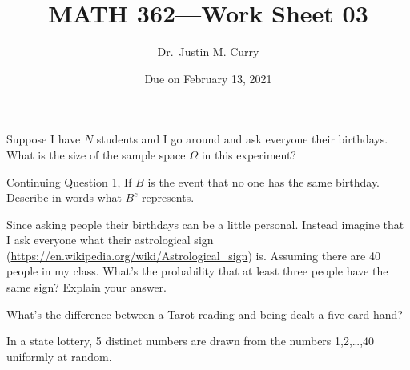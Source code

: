 \documentclass[addpoints,12pt]{exam}
\title{\vspace{-1in} MATH 362---Work Sheet 03}
\date{Due on February 13, 2021}
\author{Dr.~Justin M. Curry}
\begin{document}
\maketitle


\begin{questions}

\question[1] Suppose I have $N$ students and I go around and ask everyone their birthdays. What is the size of the sample space $\Omega$ in this experiment? 
\vspace{1in}

\question[1] Continuing Question 1, If $B$ is the event that no one has the same birthday. Describe in words what $B^c$ represents.
\vspace{1in}

\question[2] Since asking people their birthdays can be a little personal. Instead imagine that I ask everyone what their astrological sign (\url{https://en.wikipedia.org/wiki/Astrological_sign}) is. Assuming there are 40 people in my class. What's the probability that at least three people have the same sign? Explain your answer.
\vspace{1in}

\question[1] What's the difference between a Tarot reading and being dealt a five card hand?
\vspace{1in}

\question[3] In a state lottery, 5 distinct numbers are drawn from the numbers 1,2,\ldots,40 uniformly at random.
\noaddpoints
{}
\end{questions}
\end{document}
